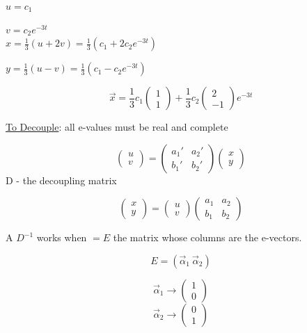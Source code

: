 \documentclass[12pt]{article}
\numberwithin{equation}{subsection}
\newcommand{\indc}{\hspace{1.5cm}}
\newcommand{\indh}{\hspace{4cm}}
\newcommand{\indq}{\hspace{8.5cm}}
\begin{document}
\indc $u=c_1$

\indc $v=c_2e^{-3t}$\\

\indh $x=\frac{1}{3}(u+2v)=\frac{1}{3}(c_1+2c_2e^{-3t})$

\indh $y=\frac{1}{3}(u-v)=\frac{1}{3}(c_1-c_2e^{-3t})$

$$ \vec{x}=\frac{1}{3}c_1\begin{pmatrix}
1 \\
1
\end{pmatrix} + \frac{1}{3}c_2\begin{pmatrix}
2 \\
-1
\end{pmatrix} e^{-3t}$$
\newpage

\noindent \underline{To Decouple}: all e-values must be real and complete


\begin{equation}
\begin{pmatrix}
u \\
v
\end{pmatrix} = \begin{pmatrix}
a_1' & a_2' \\
b_1' & b_2'
\end{pmatrix} \begin{pmatrix}
x \\
y
\end{pmatrix}
\end{equation}
\indq D - the decoupling matrix

\begin{equation}
\begin{pmatrix}
x \\
y
\end{pmatrix} = \begin{pmatrix}
u \\
v
\end{pmatrix}  \begin{pmatrix}
a_1 & a_2 \\
b_1 & b_2
\end{pmatrix} 
\end{equation}

A $D^{-1}$ works when $=E$ the matrix whose columns are the e-vectors.

\begin{equation}
E= (\vec{\alpha}_1 \ \vec{\alpha}_2)
\end{equation}

\begin{equation}
\vec{\alpha}_1 \longrightarrow \begin{pmatrix}
1 \\
0
\end{pmatrix}
\end{equation}
\begin{equation}
\vec{\alpha}_2 \longrightarrow \begin{pmatrix}
0 \\
1
\end{pmatrix}
\end{equation}
\end{document}
